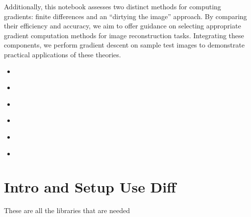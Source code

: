 \documentclass[letterpaper,10pt,english]{jupyterBook}
\begin{document}
\sphinxAtStartPar
Additionally, this notebook assesses two distinct methods for computing gradients: finite differences and an “dirtying the image” approach. By comparing their efficiency and accuracy, we aim to offer guidance on selecting appropriate gradient computation methods for image reconstruction tasks. Integrating these components, we perform gradient descent on sample test images to demonstrate practical applications of these theories.
\begin{itemize}
\item {} 
\sphinxAtStartPar
{\hyperref[\detokenize{data::doc}]{}}

\item {} 
\sphinxAtStartPar
{\hyperref[\detokenize{interpolation::doc}]{}}

\item {} 
\sphinxAtStartPar
{\hyperref[\detokenize{loss::doc}]{}}

\item {} 
\sphinxAtStartPar
{\hyperref[\detokenize{finite_gradient::doc}]{}}

\item {} 
\sphinxAtStartPar
{\hyperref[\detokenize{dirty_gradient::doc}]{}}

\item {} 
\sphinxAtStartPar
{\hyperref[\detokenize{utility::doc}]{}}

\end{itemize}

\sphinxstepscope


\chapter{Intro and Setup Use Diff}
\label{\detokenize{data:intro-and-setup-use-diff}}\label{\detokenize{data::doc}}
\sphinxAtStartPar
These are all the libraries that are needed
\end{document}
